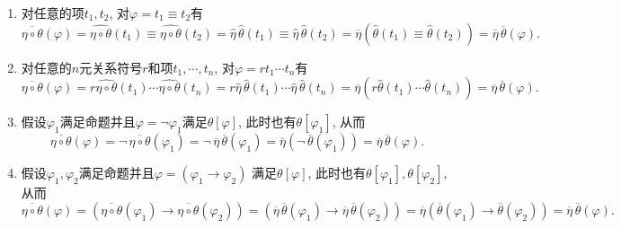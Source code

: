 \begin{enumerate}
    \item 对任意的项$t_1,t_2$, 对$\varphi=t_1\equiv t_2$有
    \vspace{3pt}
    \[
        \overline{\eta\circ\theta}(\varphi)=
        \widehat{\eta\circ\theta}(t_1)\equiv\widehat{\eta\circ\theta}(t_2)=
        \widehat{\eta}\,\widehat{\theta}(t_1)\equiv
        \widehat{\eta}\,\widehat{\theta}(t_2)=
        \overline{\eta}\left(\widehat{\theta}(t_1)\equiv\widehat{\theta}(t_2)\right)
        =\overline{\eta}\,\overline{\theta}(\varphi).
    \]

    \vspace{3pt}
    \item 对任意的$n$元关系符号$r$和项$t_1,\cdots,t_n$, 对$\varphi=rt_1\cdots t_n$有
    \vspace{3pt}
    \[
        \overline{\eta\circ\theta}(\varphi)=
        r\widehat{\eta\circ\theta}(t_1)\cdots\widehat{\eta\circ\theta}(t_n)=
        r\widehat{\eta}\,\widehat{\theta}(t_1)\cdots
        \widehat{\eta}\,\widehat{\theta}(t_n)=
        \overline{\eta}\left(r\widehat{\theta}(t_1)\cdots\widehat{\theta}(t_n)\right)
        =\overline{\eta}\,\overline{\theta}(\varphi).
    \]
    
    \vspace{3pt}
    \item 假设$\varphi_1$满足命题并且$\varphi=\neg\varphi_1$满足$\theta[\varphi]$,
    此时也有$\theta[\varphi_1]$, 从而
    \vspace{3pt}
    \[
        \overline{\eta\circ\theta}(\varphi)=
        \neg\,\overline{\eta\circ\theta}(\varphi_1)=
        \neg\,\overline{\eta}\,\overline{\theta}(\varphi_1)=
        \overline{\eta}\left(\neg\,\overline{\theta}(\varphi_1)\right)=
        \overline{\eta}\,\overline{\theta}(\varphi).
    \]

    \vspace{3pt}
    \item 假设$\varphi_1,\varphi_2$满足命题并且$\varphi=(\varphi_1\to\varphi_2)$
    满足$\theta[\varphi]$, 此时也有$\theta[\varphi_1],\theta[\varphi_2]$, 从而
    \vspace{3pt}
    \[
        \overline{\eta\circ\theta}(\varphi)=
        \left(\overline{\eta\circ\theta}(\varphi_1)\to
        \overline{\eta\circ\theta}(\varphi_2)\right)=
        \left(\overline{\eta}\,\overline{\theta}(\varphi_1)\to
        \overline{\eta}\,\overline{\theta}(\varphi_2)\right)=
        \overline{\eta}\left(\overline{\theta}(\varphi_1)\to
        \overline{\theta}(\varphi_2)\right)=
        \overline{\eta}\,\overline{\theta}(\varphi).
    \]


\end{enumerate}

